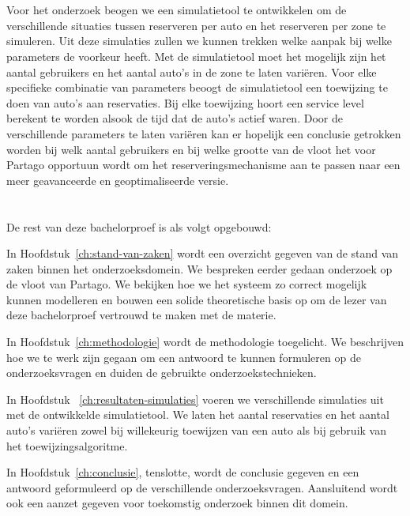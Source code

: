\section{}
\label{sec:onderzoeksdoelstelling}

Voor het onderzoek beogen we een simulatietool te ontwikkelen om de verschillende situaties tussen reserveren per auto en het reserveren per zone te simuleren. Uit deze simulaties zullen we kunnen trekken welke aanpak bij welke parameters de voorkeur heeft. Met de simulatietool moet het mogelijk zijn het aantal gebruikers en het aantal auto's in de zone te laten variëren. Voor elke specifieke combinatie van parameters beoogt de simulatietool een toewijzing te doen van auto's aan reservaties. Bij elke toewijzing hoort een service level berekent te worden alsook de tijd dat de auto's actief waren. Door de verschillende parameters te laten variëren kan er hopelijk een conclusie getrokken worden bij welk aantal gebruikers en bij welke grootte van de vloot het voor Partago opportuun wordt om het reserveringsmechanisme aan te passen naar een meer geavanceerde en geoptimaliseerde versie.

\section{}
\label{sec:opzet-bachelorproef}


De rest van deze bachelorproef is als volgt opgebouwd:

In Hoofdstuk~\ref{ch:stand-van-zaken} wordt een overzicht gegeven van de stand van zaken binnen het onderzoeksdomein. We bespreken eerder gedaan onderzoek op de vloot van Partago. We bekijken hoe we het systeem zo correct mogelijk kunnen modelleren en bouwen een solide theoretische basis op om de lezer van deze bachelorproef vertrouwd te maken met de materie.

In Hoofdstuk~\ref{ch:methodologie} wordt de methodologie toegelicht. We beschrijven hoe we te werk zijn gegaan om een antwoord te kunnen formuleren op de onderzoeksvragen en duiden de gebruikte onderzoekstechnieken.

In Hoofdstuk ~\ref{ch:resultaten-simulaties} voeren we verschillende simulaties uit met de ontwikkelde simulatietool. We laten het aantal reservaties en het aantal auto's variëren zowel bij willekeurig toewijzen van een auto als bij gebruik van het toewijzingsalgoritme.

In Hoofdstuk~\ref{ch:conclusie}, tenslotte, wordt de conclusie gegeven en een antwoord geformuleerd op de verschillende onderzoeksvragen. Aansluitend wordt ook een aanzet gegeven voor toekomstig onderzoek binnen dit domein.